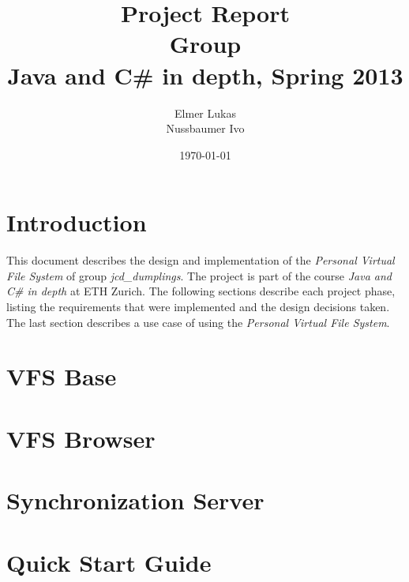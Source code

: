 \documentclass[a4paper,12pt]{article}
\title{
Project Report \\ 
Group \groupname \\
\vspace{5mm}
\large Java and C\# in depth, Spring 2013
}
\author{
Elmer Lukas \\
Nussbaumer Ivo
}
\date{\today}
\newcommand{\groupname}{jcd\_dumplings\xspace}
\begin{document}
\maketitle

\section{Introduction}

This document describes the design and implementation of the \emph{Personal Virtual File System} of group \emph{\groupname}. The project is part of the course \emph{Java and C\# in depth} at ETH Zurich. The following sections describe each project phase, listing the requirements that were implemented and the design decisions taken. The last section describes a use case of using the \emph{Personal Virtual File System}.


\section{VFS Base}




\section{VFS Browser}




\section{Synchronization Server}





\section{Quick Start Guide}


\end{document}
